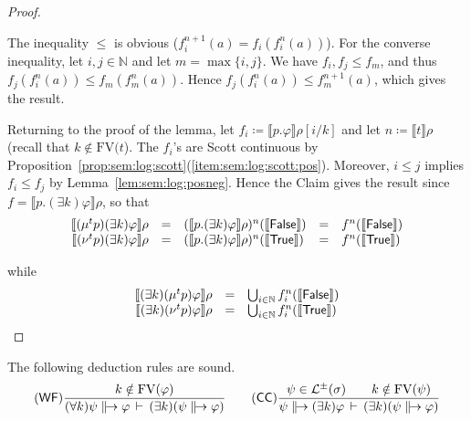 \documentclass[%
  a4paper,
  UKenglish,
  cleveref,
  autoref,
  thm-restate,
  numberwithinsect,
]{lipics-v2021}
\newcommand\deq\coloneqq
\newcommand\thesis{\vdash}
\newcommand\NN{\mathbb{N}}
\newcommand\I[1]{\llbracket #1 \rrbracket} %
\newcommand\ax[1]{(\mathsf{#1})}
\newcommand\temp[1]{\mathsf{#1}}
\newcommand\True{\temp{True}}
\newcommand\False{\temp{False}}
\newcommand\val{\rho}	%
\newcommand\FV{\mathrm{FV}}
\newcommand\defrealto{\mathrel\parallel\joinrel\to}
\newcommand\realto{\mathrel{\defrealto}}
\newcommand\PTbis{\sigma}	%
\newcommand\itvar{k}
\newcommand\FP{p}
\newcommand\finmu{\mu}
\newcommand\finnu{\nu}
\newcommand\Lang{\mathcal{L}}
\begin{document}
\begin{proof}
\begin{claimproof}
The inequality $\leq$ is obvious
($f_i^{n+1}(a) = f_i(f_i^{n}(a))$).
For the converse inequality, let $i, j \in \NN$ and let $m = \max\{i,j\}$.
We have $f_i, f_j \leq f_m$, and thus $f_j(f_i^n(a)) \leq f_m(f_m^n(a))$.
Hence $f_j(f_i^n(a)) \leq f_m^{n+1}(a)$, which gives the result.
\end{claimproof}

Returning to the proof of the lemma,
let $f_i \deq \I{\FP.\varphi}\val[i / \itvar]$
and let $n \deq \I{t}\val$ (recall that $\itvar \notin \FV(t$).
The $f_i$'s are Scott continuous by
Proposition~\ref{prop:sem:log:scott}(\ref{item:sem:log:scott:pos}).
Moreover, $i \leq j$ implies $f_i \leq f_j$
by Lemma~\ref{lem:sem:log:posneg}.
%
Hence the Claim gives the result since
$f = \I{\FP.(\exists \itvar)\varphi}\val$,
so that
\[
\begin{array}{r c l c l}
  \I{(\finmu^t \FP)(\exists \itvar)\varphi}\val
& =
& (\I{\FP. (\exists \itvar)\varphi}\val)^n(\I\False)
& =
& f^n(\I\False)
\\
%
  \I{(\finnu^t \FP)(\exists \itvar)\varphi}\val
& =
& (\I{\FP. (\exists \itvar)\varphi}\val)^n(\I\True)
& =
& f^n(\I\True)
%
\end{array}
\]

\noindent
while
\[
\begin{array}{r c l}
  \I{(\exists \itvar)(\finmu^t \FP)\varphi}\val
& =
& \bigcup_{i \in \NN} f_i^n(\I\False)
\\
%
  \I{(\exists \itvar)(\finnu^t \FP)\varphi}\val
& =
& \bigcup_{i \in \NN} f_i^n(\I\True)
%
\end{array}
\]
\end{proof}


\begin{lemma}
\label{lem:proof:sem:log:sound:wfcc}
The following deduction rules are sound.
\[
\begin{array}{c}
%
\ax{WF}
\dfrac{\itvar \notin \FV(\varphi)}
  {(\forall \itvar)\psi \realto \varphi
  \,\thesis\,
  (\exists \itvar)(\psi \realto \varphi)}
%
\qquad
%
\ax{CC}
\dfrac{\psi \in \Lang^\pm(\PTbis)
  \qquad
  \itvar \notin \FV(\psi)}
  {\psi \realto (\exists \itvar)\varphi
  \,\thesis\,
  (\exists \itvar)(\psi \realto \varphi)}
%
\end{array}
\]
\end{lemma}
\end{document}
